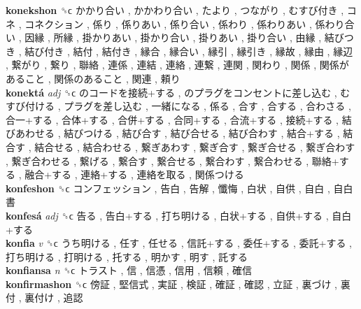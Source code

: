 \textbf{konekshon} ␝ϲ   かかり合い ,  かかわり合い ,  たより ,  つながり ,  むすび付き ,  コネ ,  コネクション ,  係り ,  係りあい ,  係り合い ,  係わり ,  係わりあい ,  係わり合い ,  因縁 ,  所縁 ,  掛かりあい ,  掛かり合い ,  掛りあい ,  掛り合い ,  由縁 ,  結びつき ,  結び付き ,  結付 ,  結付き ,  縁合 ,  縁合い ,  縁引 ,  縁引き ,  縁故 ,  縁由 ,  縁辺 ,  繋がり ,  繋り ,  聯絡 ,  連係 ,  連結 ,  連絡 ,  連繋 ,  連関 ,  関わり ,  関係 ,  関係があること ,  関係のあること ,  関連 ,  頼り   \\
\textbf{konektá} \emph{adj}  ␝ϲ   のコードを接続+する ,  のプラグをコンセントに差し込む ,  むすび付ける ,  プラグを差し込む ,  一緒になる ,  係る ,  合す ,  合する ,  合わさる ,  合一+する ,  合体+する ,  合併+する ,  合同+する ,  合流+する ,  接続+する ,  結びあわせる ,  結びつける ,  結び合す ,  結び合せる ,  結び合わす ,  結合+する ,  結合す ,  結合せる ,  結合わせる ,  繋ぎあわす ,  繋ぎ合す ,  繋ぎ合せる ,  繋ぎ合わす ,  繋ぎ合わせる ,  繋げる ,  繋合す ,  繋合せる ,  繋合わす ,  繋合わせる ,  聯絡+する ,  融合+する ,  連絡+する ,  連絡を取る ,  関係つける   \\
\textbf{konfeshon} ␝ϲ   コンフェッション ,  告白 ,  告解 ,  懺悔 ,  白状 ,  自供 ,  自白 ,  自白書   \\
\textbf{konfesá} \emph{adj}  ␝ϲ   告る ,  告白+する ,  打ち明ける ,  白状+する ,  自供+する ,  自白+する   \\
\textbf{konfia} \emph{v}  ␝ϲ   うち明ける ,  任す ,  任せる ,  信託+する ,  委任+する ,  委託+する ,  打ち明ける ,  打明ける ,  托する ,  明かす ,  明す ,  託する   \\
\textbf{konfiansa} \emph{n}  ␝ϲ   トラスト ,  信 ,  信憑 ,  信用 ,  信頼 ,  確信   \\
\textbf{konfirmashon} ␝ϲ   傍証 ,  堅信式 ,  実証 ,  検証 ,  確証 ,  確認 ,  立証 ,  裏づけ ,  裏付 ,  裏付け ,  追認   \\
